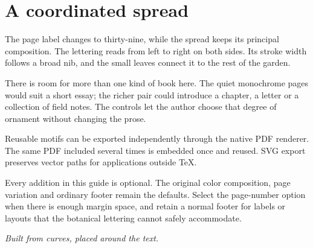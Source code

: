 \documentclass[11pt,a4paper,twoside]{article}
\begin{document}
\section{A coordinated spread}
The page label changes to thirty-nine, while the spread keeps its principal
composition. The lettering reads from left to right on both sides. Its stroke
width follows a broad nib, and the small leaves connect it to the rest of the garden.

There is room for more than one kind of book here. The quiet monochrome pages
would suit a short essay; the richer pair could introduce a chapter, a letter
or a collection of field notes. The controls let the author choose that degree
of ornament without changing the prose.

\florilegiumdivider[32mm]

Reusable motifs can be exported independently through the native PDF renderer.
The same PDF included several times is embedded once and reused. SVG export
preserves vector paths for applications outside TeX.

Every addition in this guide is optional. The original color composition,
page variation and ordinary footer remain the defaults. Select the page-number
option when there is enough margin space, and retain a normal footer for labels
or layouts that the botanical lettering cannot safely accommodate.

\smallskip\noindent\textit{Built from curves, placed around the text.}
\end{document}
